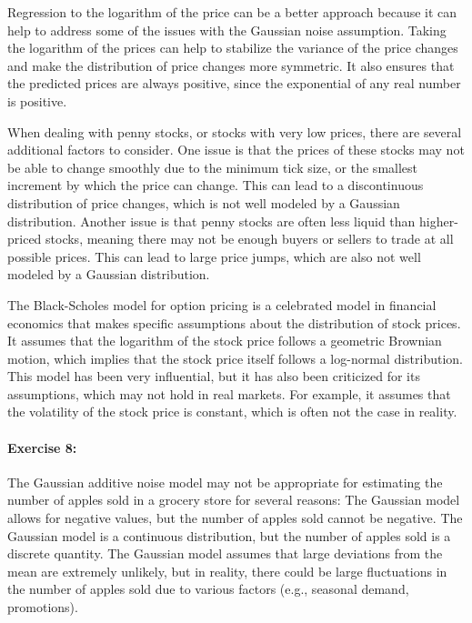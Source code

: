 Regression to the logarithm of the price can be a better approach because it can help to address some of the issues with the Gaussian noise assumption.
Taking the logarithm of the prices can help to stabilize the variance of the price changes and make the distribution of price changes more symmetric.
It also ensures that the predicted prices are always positive, since the exponential of any real number is positive.

When dealing with penny stocks, or stocks with very low prices, there are several additional factors to consider.
One issue is that the prices of these stocks may not be able to change smoothly due to the minimum tick size, or the smallest increment by which the price can change.
This can lead to a discontinuous distribution of price changes, which is not well modeled by a Gaussian distribution.
Another issue is that penny stocks are often less liquid than higher-priced stocks, meaning there may not be enough buyers or sellers to trade at all possible prices.
This can lead to large price jumps, which are also not well modeled by a Gaussian distribution.

The Black-Scholes model for option pricing is a celebrated model in financial economics that makes specific assumptions about the distribution of stock prices.
It assumes that the logarithm of the stock price follows a geometric Brownian motion, which implies that the stock price itself follows a log-normal distribution.
This model has been very influential, but it has also been criticized for its assumptions, which may not hold in real markets.
For example, it assumes that the volatility of the stock price is constant, which is often not the case in reality.

\paragraph{Exercise 8:}

The Gaussian additive noise model may not be appropriate for estimating the number of apples sold in a grocery store for several reasons:
The Gaussian model allows for negative values, but the number of apples sold cannot be negative.
The Gaussian model is a continuous distribution, but the number of apples sold is a discrete quantity.
The Gaussian model assumes that large deviations from the mean are extremely unlikely, but in reality, there could be large fluctuations in the number of apples sold due to various factors (e.g., seasonal demand, promotions).

